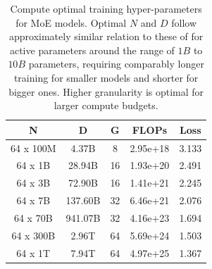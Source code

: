 \begin{table}[h]
    \centering
    \caption{Compute optimal training hyper-parameters for MoE models. Optimal $N$ and $D$ follow approximately similar relation to these of \cite{hoffmann2022training} for active parameters around the range of $1B$ to $10B$ parameters, requiring comparably longer training for smaller models and shorter for bigger ones. Higher granularity is optimal for larger compute budgets.
    }
    \vspace{0.2cm}
    \begin{tabular}{ccccc}
    \toprule
        N & D & G & FLOPs & Loss \\
        \midrule
        64 x 100M & 4.37B  & 8 & 2.95e+18 & 3.133 \\ 
        64 x 1B & 28.94B  & 16 & 1.93e+20 & 2.491 \\
        64 x 3B & 72.90B  & 16 & 1.41e+21 & 2.245\\
        64 x 7B & 137.60B  & 32 & 6.46e+21 & 2.076 \\
        64 x 70B & 941.07B  & 32 & 4.16e+23 & 1.694  \\
        64 x 300B & 2.96T & 64 & 5.69e+24 & 1.503  \\
        64 x 1T & 7.94T  & 64 & 4.97e+25 & 1.367 \\
        \bottomrule
    \end{tabular}
    \label{compute_opt}
\end{table}









